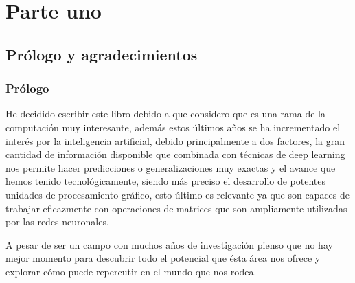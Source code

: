 \documentclass[11pt,fleqn]{book} %
\begin{document}


\pagestyle{empty} %

\tableofcontents %


\pagestyle{fancy} %


\part{Parte uno}



\chapter{Prólogo y agradecimientos}

\section{Prólogo}

He decidido escribir este libro debido a que considero que es una rama de la computación muy interesante, además estos últimos años se ha incrementado el interés por la inteligencia artificial, debido principalmente a dos factores, la gran cantidad de información disponible que combinada con técnicas de deep learning nos permite hacer predicciones o generalizaciones muy exactas y el avance que hemos tenido tecnológicamente, siendo más preciso el desarrollo de potentes unidades de procesamiento gráfico, esto último es relevante ya que son capaces de trabajar eficazmente con operaciones de matrices que son ampliamente utilizadas por las redes neuronales.

A pesar de ser un campo con muchos años de investigación pienso que no hay mejor momento para descubrir todo el potencial que ésta área nos ofrece y explorar cómo puede repercutir en el mundo que nos rodea.
\end{document}
